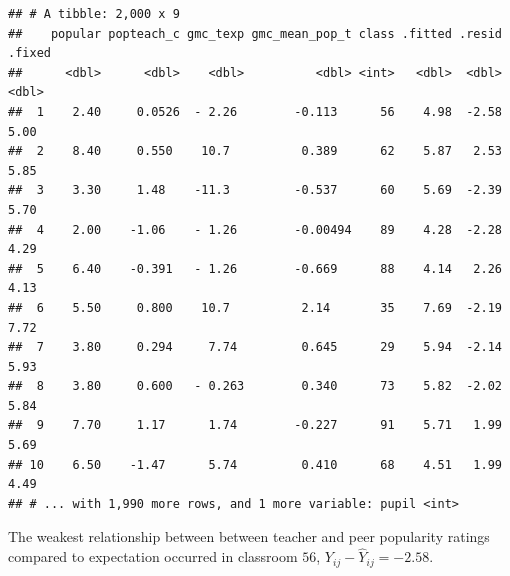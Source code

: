 \documentclass[]{article}
\newenvironment{Shaded}{\begin{snugshade}}{\end{snugshade}}
\newcommand{\KeywordTok}[1]{\textcolor[rgb]{0.13,0.29,0.53}{\textbf{#1}}}
\newcommand{\DataTypeTok}[1]{\textcolor[rgb]{0.13,0.29,0.53}{#1}}
\newcommand{\DecValTok}[1]{\textcolor[rgb]{0.00,0.00,0.81}{#1}}
\newcommand{\StringTok}[1]{\textcolor[rgb]{0.31,0.60,0.02}{#1}}
\newcommand{\CommentTok}[1]{\textcolor[rgb]{0.56,0.35,0.01}{\textit{#1}}}
\newcommand{\OperatorTok}[1]{\textcolor[rgb]{0.81,0.36,0.00}{\textbf{#1}}}
\newcommand{\NormalTok}[1]{#1}
\begin{document}
\begin{Shaded}
\end{Shaded}

\begin{verbatim}
## # A tibble: 2,000 x 9
##    popular popteach_c gmc_texp gmc_mean_pop_t class .fitted .resid .fixed
##      <dbl>      <dbl>    <dbl>          <dbl> <int>   <dbl>  <dbl>  <dbl>
##  1    2.40     0.0526  - 2.26        -0.113      56    4.98  -2.58   5.00
##  2    8.40     0.550    10.7          0.389      62    5.87   2.53   5.85
##  3    3.30     1.48    -11.3         -0.537      60    5.69  -2.39   5.70
##  4    2.00    -1.06    - 1.26        -0.00494    89    4.28  -2.28   4.29
##  5    6.40    -0.391   - 1.26        -0.669      88    4.14   2.26   4.13
##  6    5.50     0.800    10.7          2.14       35    7.69  -2.19   7.72
##  7    3.80     0.294     7.74         0.645      29    5.94  -2.14   5.93
##  8    3.80     0.600   - 0.263        0.340      73    5.82  -2.02   5.84
##  9    7.70     1.17      1.74        -0.227      91    5.71   1.99   5.69
## 10    6.50    -1.47      5.74         0.410      68    4.51   1.99   4.49
## # ... with 1,990 more rows, and 1 more variable: pupil <int>
\end{verbatim}

\begin{Shaded}
\begin{Highlighting}[]
\CommentTok{# %
\end{Highlighting}
\end{Shaded}

The weakest relationship between between teacher and peer popularity
ratings compared to expectation occurred in classroom \(56\),
\(Y_{ij} - \hat{Y}_{ij} = -2.58\).
\end{document}
